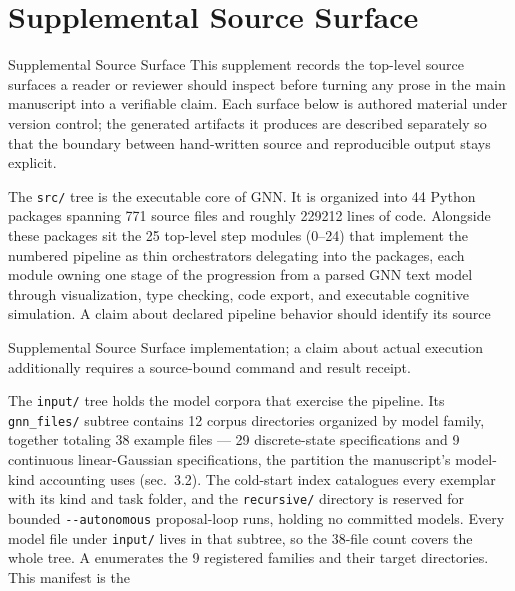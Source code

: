 \documentclass[
  ignorenonframetext,
]{beamer}
\author{\texorpdfstring{}{}}
\date{}
\begin{document}
\section{Supplemental Source Surface}\label{sec:source_surface}

\begin{frame}{Supplemental Source Surface}
This supplement records the top-level source surfaces a reader or
reviewer should inspect before turning any prose in the main manuscript
into a verifiable claim. Each surface below is authored material under
version control; the generated artifacts it produces are described
separately so that the boundary between hand-written source and
reproducible output stays explicit.

The \texttt{src/} tree is the executable core of GNN. It is organized
into 44 Python packages spanning 771 source files and roughly 229212
lines of code. Alongside these packages sit the 25 top-level step
modules (0--24) that implement the numbered pipeline as thin
orchestrators delegating into the packages, each module owning one stage
of the progression from a parsed GNN text model through visualization,
type checking, code export, and executable cognitive simulation. A claim
about declared pipeline behavior should identify its source
\end{frame}

\begin{frame}{Supplemental Source Surface}
implementation; a claim about actual execution additionally requires a
source-bound command and result receipt.

The \texttt{input/} tree holds the model corpora that exercise the
pipeline. Its \texttt{gnn\_files/} subtree contains 12 corpus
directories organized by model family, together totaling 38 example
files --- 29 discrete-state specifications and 9 continuous
linear-Gaussian specifications, the partition the manuscript's
model-kind accounting uses (sec.~3.2). The cold-start
index  catalogues every exemplar with
its kind and task folder, and the \texttt{recursive/} directory is
reserved for bounded \texttt{-\/-autonomous} proposal-loop runs, holding
no committed models. Every model file under \texttt{input/} lives in
that subtree, so the 38-file count covers the whole tree. A
 enumerates the 9 registered
families and their target directories. This manifest is the
\end{frame}
\end{document}
